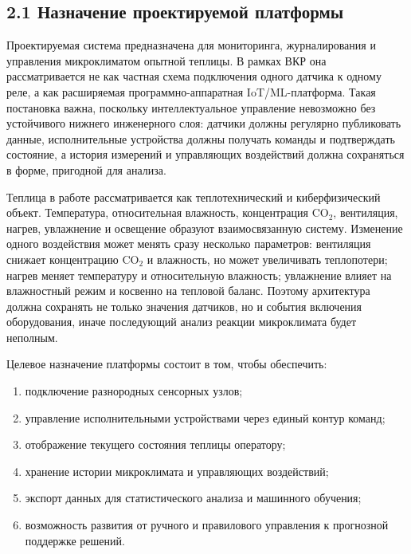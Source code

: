 \documentclass[a4paper,14pt]{extarticle}
\providecommand{\tightlist}{%
  \setlength{\itemsep}{0pt}\setlength{\parskip}{0pt}}
\begin{document}
\hypertarget{ux43dux430ux437ux43dux430ux447ux435ux43dux438ux435-ux43fux440ux43eux435ux43aux442ux438ux440ux443ux435ux43cux43eux439-ux43fux43bux430ux442ux444ux43eux440ux43cux44b}{%
\subsection{2.1 Назначение проектируемой
платформы}\label{ux43dux430ux437ux43dux430ux447ux435ux43dux438ux435-ux43fux440ux43eux435ux43aux442ux438ux440ux443ux435ux43cux43eux439-ux43fux43bux430ux442ux444ux43eux440ux43cux44b}}

Проектируемая система предназначена для мониторинга, журналирования и
управления микроклиматом опытной теплицы. В рамках ВКР она
рассматривается не как частная схема подключения одного датчика к одному
реле, а как расширяемая программно-аппаратная IoT/ML-платформа. Такая
постановка важна, поскольку интеллектуальное управление невозможно без
устойчивого нижнего инженерного слоя: датчики должны регулярно
публиковать данные, исполнительные устройства должны получать команды и
подтверждать состояние, а история измерений и управляющих воздействий
должна сохраняться в форме, пригодной для анализа.

Теплица в работе рассматривается как теплотехнический и киберфизический
объект. Температура, относительная влажность, концентрация CO\(_2\),
вентиляция, нагрев, увлажнение и освещение образуют взаимосвязанную
систему. Изменение одного воздействия может менять сразу несколько
параметров: вентиляция снижает концентрацию CO\(_2\) и влажность, но
может увеличивать теплопотери; нагрев меняет температуру и относительную
влажность; увлажнение влияет на влажностный режим и косвенно на тепловой
баланс. Поэтому архитектура должна сохранять не только значения
датчиков, но и события включения оборудования, иначе последующий анализ
реакции микроклимата будет неполным.

Целевое назначение платформы состоит в том, чтобы обеспечить:

\begin{enumerate}
\def\labelenumi{\arabic{enumi})}
\tightlist
\item
  подключение разнородных сенсорных узлов;
\item
  управление исполнительными устройствами через единый контур команд;
\item
  отображение текущего состояния теплицы оператору;
\item
  хранение истории микроклимата и управляющих воздействий;
\item
  экспорт данных для статистического анализа и машинного обучения;
\item
  возможность развития от ручного и правилового управления к прогнозной
  поддержке решений.
\end{enumerate}
\end{document}
